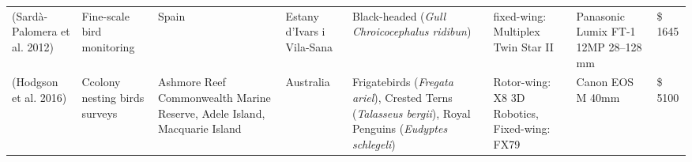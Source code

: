 \documentclass[]{interact}
\theoremstyle{plain}%
\theoremstyle{definition}
\theoremstyle{remark}
\begin{document}
\begin{longtable}[]{@{}llllllll@{}}
\begin{minipage}[t]{0.11\columnwidth}
(Sardà-Palomera et al. 2012)\strut
\end{minipage} & \begin{minipage}[t]{0.18\columnwidth}\raggedright\strut
Fine-scale bird monitoring\strut
\end{minipage} & \begin{minipage}[t]{0.03\columnwidth}\raggedright\strut
Spain\strut
\end{minipage} & \begin{minipage}[t]{0.14\columnwidth}\raggedright\strut
Estany d'Ivars i Vila-Sana\strut
\end{minipage} & \begin{minipage}[t]{0.10\columnwidth}\raggedright\strut
Black-headed (\emph{Gull Chroicocephalus ridibun})\strut
\end{minipage} & \begin{minipage}[t]{0.09\columnwidth}\raggedright\strut
fixed-wing: Multiplex Twin Star II\strut
\end{minipage} & \begin{minipage}[t]{0.11\columnwidth}\raggedright\strut
Panasonic Lumix FT-1 12MP 28--128 mm\strut
\end{minipage} & \begin{minipage}[t]{0.01\columnwidth}\raggedright\strut
\$ 1645\strut
\end{minipage}\tabularnewline
\begin{minipage}[t]{0.11\columnwidth}\raggedright\strut
(Hodgson et al. 2016)\strut
\end{minipage} & \begin{minipage}[t]{0.18\columnwidth}\raggedright\strut
Ccolony nesting birds surveys\strut
\end{minipage} & \begin{minipage}[t]{0.03\columnwidth}\raggedright\strut
Ashmore Reef Commonwealth Marine Reserve, Adele Island, Macquarie
Island\strut
\end{minipage} & \begin{minipage}[t]{0.14\columnwidth}\raggedright\strut
Australia\strut
\end{minipage} & \begin{minipage}[t]{0.10\columnwidth}\raggedright\strut
Frigatebirds (\emph{Fregata ariel}), Crested Terns (\emph{Talasseus
bergii}), Royal Penguins (\emph{Eudyptes schlegeli})\strut
\end{minipage} & \begin{minipage}[t]{0.09\columnwidth}\raggedright\strut
Rotor-wing: X8 3D Robotics, Fixed-wing: FX79\strut
\end{minipage} & \begin{minipage}[t]{0.11\columnwidth}\raggedright\strut
Canon EOS M 40mm\strut
\end{minipage} & \begin{minipage}[t]{0.01\columnwidth}\raggedright\strut
\$ 5100\strut
\end{minipage}\tabularnewline
\bottomrule
\end{longtable}
\end{document}

